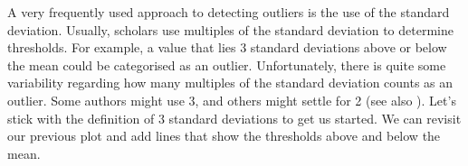 \documentclass[
]{book}
\newenvironment{Shaded}{\begin{snugshade}}{\end{snugshade}}
\newcommand{\AttributeTok}[1]{\textcolor[rgb]{0.77,0.63,0.00}{#1}}
\newcommand{\CommentTok}[1]{\textcolor[rgb]{0.56,0.35,0.01}{\textit{#1}}}
\newcommand{\ConstantTok}[1]{\textcolor[rgb]{0.00,0.00,0.00}{#1}}
\newcommand{\DecValTok}[1]{\textcolor[rgb]{0.00,0.00,0.81}{#1}}
\newcommand{\FunctionTok}[1]{\textcolor[rgb]{0.00,0.00,0.00}{#1}}
\newcommand{\NormalTok}[1]{#1}
\newcommand{\OtherTok}[1]{\textcolor[rgb]{0.56,0.35,0.01}{#1}}
\newcommand{\SpecialCharTok}[1]{\textcolor[rgb]{0.00,0.00,0.00}{#1}}
\newcommand{\StringTok}[1]{\textcolor[rgb]{0.31,0.60,0.02}{#1}}
\begin{document}
A very frequently used approach to detecting outliers is the use of the standard deviation. Usually, scholars use multiples of the standard deviation to determine thresholds. For example, a value that lies 3 standard deviations above or below the mean could be categorised as an outlier. Unfortunately, there is quite some variability regarding how many multiples of the standard deviation counts as an outlier. Some authors might use 3, and others might settle for 2 (see also \citet{leys2013detecting}). Let's stick with the definition of 3 standard deviations to get us started. We can revisit our previous plot and add lines that show the thresholds above and below the mean.

\begin{Shaded}
\end{Shaded}
\end{document}
